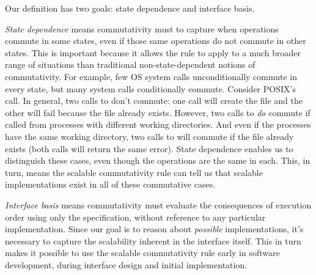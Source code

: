 Our definition has two goals: state dependence and interface basis.

\emph{State dependence} means \SIM commutativity must to capture when
operations commute in some states, even if those same operations do
not commute in other states.
%
This is important because it allows the rule to apply to a much
broader range of
situations than traditional non-state-dependent notions of
commutativity.
%
For example, few OS system calls unconditionally commute in
every state, but many system calls conditionally commute.
%
Consider POSIX's  call.
%
In general, two calls to  don't
commute: one call will create the file and the other will
fail because the file already exists.
%
However, two calls to  \emph{do}
commute if called from processes with different working
directories.  And even if the processes have the same working
directory, two calls to  will commute
{if the file already exists} (both
calls will return the same error).
%
  
%
State dependence enables us to distinguish these cases, even though the
operations are the same in each.  This, in turn, means the scalable
commutativity
rule can tell us that scalable implementations exist in all of these
commutative
cases.
%

\emph{Interface basis} means \SIM commutativity must
evaluate the consequences of execution order using only the
specification, without reference to any particular implementation.
%
Since our goal is to reason about
\emph{possible} implementations, it's necessary to capture the
scalability inherent in the interface
itself.
%
This in turn makes it
possible to use the scalable commutativity rule early in software development,
during interface design and initial implementation.
%

